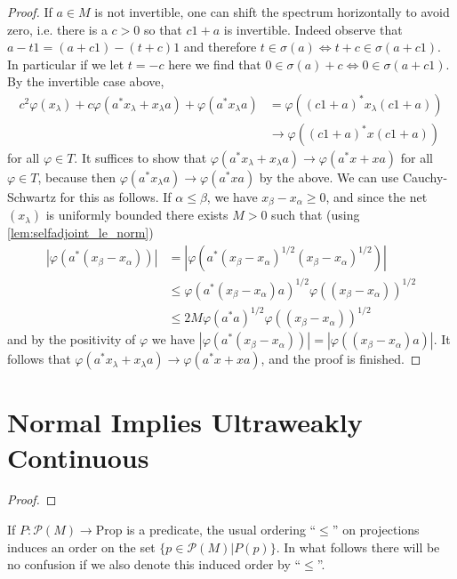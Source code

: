 \begin{proof}
  If $a\in M$ is not invertible, one can shift the spectrum horizontally to avoid zero, i.e. there is a $c>0$ so that $c1+a$ is invertible. Indeed
  observe that $a-t1=(a+c1)-(t+c)1$ and therefore $t\in \sigma(a)\iff t+c \in \sigma(a+c1)$. In particular if we let $t=-c$ here we find that
  $0\in \sigma(a)+c \iff 0 \in \sigma(a+c1)$.
  By the invertible case above,
  \begin{align}
    c^2\varphi(x_{\lambda})+c\varphi(a^{*}x_{\lambda}+x_{\lambda}a)+\varphi(a^{*}x_{\lambda}a)&=\varphi((c1+a)^{*}x_{\lambda}(c1+a))\\\nonumber
    &\to \varphi((c1+a)^{*}x(c1+a))
  \end{align}
  for all $\varphi\in T$.
  It suffices to show that $\varphi(a^{*}x_{\lambda}+x_{\lambda}a)\to \varphi(a^{*}x+xa)$ for all $\varphi\in T$,
  because then $\varphi(a^{*}x_{\lambda}a)\to \varphi(a^{*}xa)$ by the above. We can use Cauchy-Schwartz for this as follows. If $\alpha\le \beta$,
  we have $x_{\beta}-x_{\alpha}\ge 0$, and since the net $(x_{\lambda})$ is uniformly bounded there exists $M>0$ such that (using \ref{lem:selfadjoint_le_norm})
  \begin{align}
    |\varphi(a^{*}(x_{\beta}-x_{\alpha}))|&=|\varphi(a^{*}(x_{\beta}-x_{\alpha})^{1/2}(x_{\beta}-x_{\alpha})^{1/2})|\\\nonumber
                                          &\le \varphi(a^{*}(x_{\beta}-x_{\alpha})a)^{1/2}\varphi((x_{\beta}-x_{\alpha}))^{1/2}\\\nonumber
                                          &\le 2M\varphi(a^{*}a)^{1/2}\varphi((x_{\beta}-x_{\alpha}))^{1/2}
  \end{align}
  and by the positivity of $\varphi$ we have $|\varphi(a^{*}(x_{\beta}-x_{\alpha}))|=|\varphi((x_{\beta}-x_{\alpha})a)|$.
  It follows that $\varphi(a^{*}x_{\lambda}+x_{\lambda}a)\to \varphi(a^{*}x+xa)$, and the proof is finished.
\end{proof}

\section{Normal Implies Ultraweakly Continuous}

\begin{proof}
\end{proof}

If $P:\mathcal{P}(M)\to \text{Prop}$ is a predicate, the usual ordering ``$\le$'' on projections
induces an order on the set $\{p\in \mathcal{P}(M)|P(p)\}$. In what follows there will be no confusion if
we also denote this induced order by ``$\le$''.

